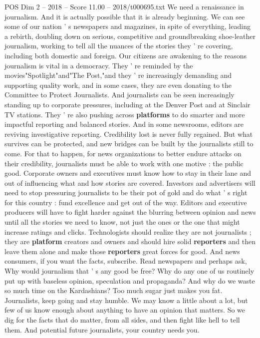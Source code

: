 \begin{textsample}{POS Dim 2 – 2018 – Score 11.00 – 2018/t000695.txt}
We need a renaissance in journalism.
And it is actually possible that it is already beginning.
We can see some of our nation ' s newspapers and magazines, in spite of everything, leading a rebirth, doubling down on serious, competitive and groundbreaking shoe-leather journalism, working to tell all the nuances of the stories they ' re covering, including both domestic and foreign.
Our citizens are awakening to the reasons journalism is vital in a democracy.
They ' re reminded by the movies"Spotlight"and"The Post,"and they ' re increasingly demanding and supporting quality work, and in some cases, they are even donating to the Committee to Protect Journalists.
And journalists can be seen increasingly standing up to corporate pressures, including at the Denver Post and at Sinclair TV stations.
They ' re also pushing across \textbf{platforms} to do smarter and more impactful reporting and balanced stories.
And in some newsrooms, editors are reviving investigative reporting.
Credibility lost is never fully regained.
But what survives can be protected, and new bridges can be built by the journalists still to come.
For that to happen, for news organizations to better endure attacks on their credibility, journalists must be able to work with one motive : the public good.
Corporate owners and executives must know how to stay in their lane and out of influencing what and how stories are covered.
Investors and advertisers will need to stop pressuring journalists to be their pot of gold and do what ' s right for this country : fund excellence and get out of the way.
Editors and executive producers will have to fight harder against the blurring between opinion and news until all the stories we need to know, not just the ones or the one that might increase ratings and clicks.
Technologists should realize they are not journalists ; they are \textbf{platform} creators and owners and should hire solid \textbf{reporters} and then leave them alone and make those \textbf{reporters} great forces for good.
And news consumers, if you want the facts, subscribe.
Read newspapers and perhaps ask, Why would journalism that ' s any good be free?
Why do any one of us routinely put up with baseless opinion, speculation and propaganda?
And why do we waste so much time on the Kardashians?
Too much sugar just makes you fat.
Journalists, keep going and stay humble.
We may know a little about a lot, but few of us know enough about anything to have an opinion that matters.
So we dig for the facts that do matter, from all sides, and then fight like hell to tell them.
And potential future journalists, your country needs you.

\end{textsample}

